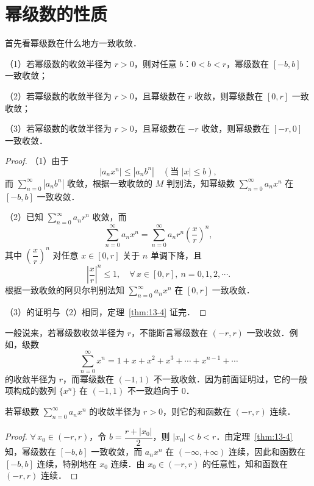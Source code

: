 \section{幂级数的性质}

首先看幂级数在什么地方一致收敛．

\begin{theorem}[阿贝尔第二定理]\label{thm:13-4}

（1）若幂级数的收敛半径为 $r>0$，则对任意 $b$：$0<b<r$，幂级数在 $[-b,b]$ 一致收敛；

（2）若幂级数的收敛半径为 $r>0$，且幂级数在 $r$ 收敛，则幂级数在 $[0,r]$ 一致收敛；

（3）若幂级数的收敛半径为 $r>0$，且幂级数在 $-r$ 收敛，则幂级数在 $[-r,0]$ 一致收敛．
\end{theorem}

\begin{proof}
（1）由于
\[
\left|a_{n}x^{n}\right|\leqslant\left|a_{n}b^{n}\right|\quad(\text{当 }\left|x\right|\leqslant b),
\]
而 $\displaystyle\sum_{n=0}^{\infty}\left|a_{n}b^{n}\right|$ 收敛，根据一致收敛的 $M$ 判别法，知幂级数 $\displaystyle\sum_{n=0}^{\infty}a_{n}x^{n}$ 在 $[-b,b]$ 一致收敛．

（2）已知 $\displaystyle\sum_{n=0}^{\infty}a_{n}r^{n}$ 收敛，而
\[
\sum_{n=0}^{\infty}a_{n}x^{n}=\sum_{n=0}^{\infty}a_{n}r^{n}\left(\frac{x}{r}\right)^{n},
\]
其中 $\left(\dfrac{x}{r}\right)^{n}$ 对任意 $x\in[0,r]$ 关于 $n$ 单调下降，且
\[
\left|\frac{x}{r}\right|^{n}\leqslant 1,\quad\forall\,x\in[0,r],\ n=0,1,2,\cdots.
\]
根据一致收敛的阿贝尔判别法知 $\displaystyle\sum_{n=0}^{\infty}a_{n}x^{n}$ 在 $[0,r]$ 一致收敛．

（3）的证明与（2）相同，定理~\ref{thm:13-4} 证完．
\end{proof}

一般说来，若幂级数收敛半径为 $r$，不能断言幂级数在 $(-r,r)$ 一致收敛．例如，级数
\[
\sum_{n=0}^{\infty}x^{n}=1+x+x^{2}+x^{3}+\cdots+x^{n-1}+\cdots
\]
的收敛半径为 $r$，而幂级数在 $(-1,1)$ 不一致收敛．因为前面证明过，它的一般项构成的数列 $\{x^{n}\}$ 在 $(-1,1)$ 不一致趋向于 $0$．

\begin{corollary}\label{cor:13-2-1}
若幂级数 $\displaystyle\sum_{n=0}^{\infty}a_{n}x^{n}$ 的收敛半径为 $r>0$，则它的和函数在 $(-r,r)$ 连续．
\end{corollary}

\begin{proof}
$\forall\,x_{0}\in(-r,r)$，令 $b=\dfrac{r+\left|x_{0}\right|}{2}$，则 $\left|x_{0}\right|<b<r$．由定理~\ref{thm:13-4} 知，幂级数在 $[-b,b]$ 一致收敛，而 $a_{n}x^{n}$ 在 $(-\infty,+\infty)$ 连续，因此和函数在 $[-b,b]$ 连续，特别地在 $x_{0}$ 连续．由 $x_{0}\in(-r,r)$ 的任意性，知和函数在 $(-r,r)$ 连续．
\end{proof}

